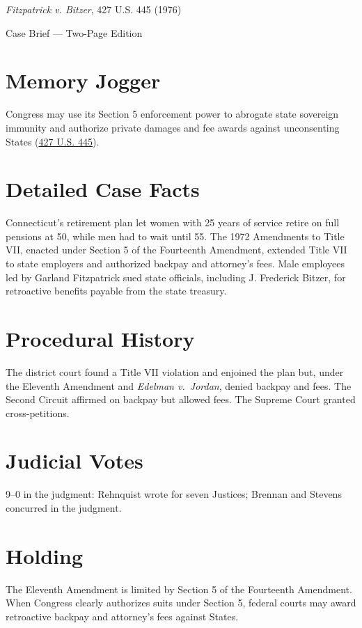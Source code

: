 \documentclass[12pt]{article}
\begin{document}
\begin{center}
{\LARGE \textit{Fitzpatrick v. Bitzer}, 427 U.S. 445 (1976)\par}
\vspace{0.5em}
{\large Case Brief --- Two-Page Edition\par}
\end{center}

\section{Memory Jogger}
Congress may use its Section 5 enforcement power to abrogate state sovereign immunity and authorize private damages and fee awards against unconsenting States (\href{https://supreme.justia.com/cases/federal/us/427/445/}{427 U.S. 445}).

\section{Detailed Case Facts}
Connecticut's retirement plan let women with 25 years of service retire on full pensions at 50, while men had to wait until 55. The 1972 Amendments to Title VII, enacted under Section 5 of the Fourteenth Amendment, extended Title VII to state employers and authorized backpay and attorney's fees. Male employees led by Garland Fitzpatrick sued state officials, including J. Frederick Bitzer, for retroactive benefits payable from the state treasury.

\section{Procedural History}
The district court found a Title VII violation and enjoined the plan but, under the Eleventh Amendment and \textit{Edelman v.\ Jordan}, denied backpay and fees. The Second Circuit affirmed on backpay but allowed fees. The Supreme Court granted cross-petitions.

\section{Judicial Votes}
9--0 in the judgment: Rehnquist wrote for seven Justices; Brennan and Stevens concurred in the judgment.

\section{Holding}
The Eleventh Amendment is limited by Section 5 of the Fourteenth Amendment. When Congress clearly authorizes suits under Section 5, federal courts may award retroactive backpay and attorney's fees against States.
\end{document}
